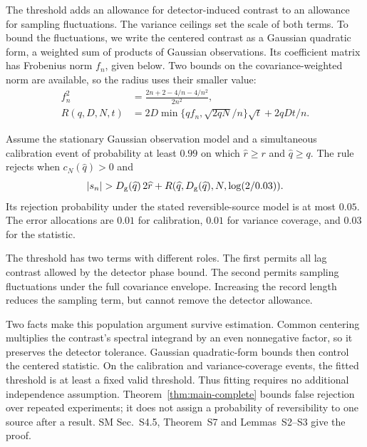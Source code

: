 The threshold adds an allowance for detector-induced contrast to an allowance for sampling fluctuations. The variance ceilings set the scale of both terms. To bound the fluctuations, we write the centered contrast as a Gaussian quadratic form, a weighted sum of products of Gaussian observations. Its coefficient matrix has Frobenius norm $f_n$, given below. Two bounds on the covariance-weighted norm are available, so the radius uses their smaller value:
\begin{align}
 f_n^2&=\frac{2n+2-4/n-4/n^2}{2n^2},\\
 R(q,D,N,t)&=2D\min\{qf_n,\sqrt{2qN}/n\}\sqrt t
                  +2qDt/n.\label{eq:main-radius}
\end{align}
\begin{theorem}\label{thm:main-complete}
Assume the stationary Gaussian observation model and a simultaneous calibration event of probability at least $0.99$ on which $\widehat r\ge r$ and $\widehat q\ge q$. The rule rejects when $c_N(\widehat q)>0$ and
\begin{equation}
 |s_n|>D_{\rm g}(\widehat q)\,2\widehat r+
 R(\widehat q,D_{\rm g}(\widehat q),N,\log(2/0.03)).
 \label{eq:main-test}
\end{equation}
Its rejection probability under the stated reversible-source model is at most $0.05$. The error allocations are $0.01$ for calibration, $0.01$ for variance coverage, and $0.03$ for the statistic.
\end{theorem}

The threshold has two terms with different roles. The first permits all lag contrast allowed by the detector phase bound. The second permits sampling fluctuations under the full covariance envelope. Increasing the record length reduces the sampling term, but cannot remove the detector allowance.

Two facts make this population argument survive estimation. Common centering multiplies the contrast's spectral integrand by an even nonnegative factor, so it preserves the detector tolerance. Gaussian quadratic-form bounds then control the centered statistic. On the calibration and variance-coverage events, the fitted threshold is at least a fixed valid threshold. Thus fitting requires no additional independence assumption. Theorem~\ref{thm:main-complete} bounds false rejection over repeated experiments; it does not assign a probability of reversibility to one source after a result. SM Sec.~S4.5, Theorem~S7 and Lemmas~S2--S3 give the proof.

